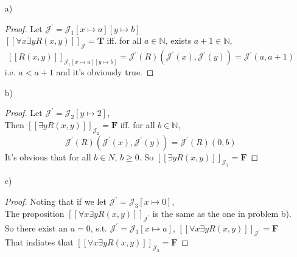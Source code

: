 \documentclass{article}
\begin{document}
\begin{itemize}
    \item[a)]
    \begin{proof}
        Let $\mathcal{J^\prime} = \mathcal{J}_1 [x \mapsto a][y \mapsto b]$ \\
        $
            [\![ \forall x \exists y R(x, y) ]\!]_\mathcal{J} = \mathbf{T}
        $
        iff. for all $a \in \mathbb{N}$, exists $a + 1 \in \mathbb{N}$, 
        \[
            [\![ R(x, y) ]\!]_{\mathcal{J}_1 [x \mapsto a][y \mapsto b]} = \mathcal{J}^\prime (R)(\mathcal{J}^\prime(x), \mathcal{J}^\prime(y)) = \mathcal{J}^\prime(a, a + 1) 
        \]
        i.e. $ a < a + 1 $ and it's obviously true.
    \end{proof}
    \item[b)]
    \begin{proof}
        Let $\mathcal{J}^\prime = \mathcal{J}_2[y \mapsto 2]$, \\
        Then $ [\![ \exists y R(x, y) ]\!]_{\mathcal{J}_2} = \mathbf{F} $ 
        iff. for all $b \in \mathbb{N}$, 
        $$
            \mathcal{J}^\prime (R)(\mathcal{J}^\prime(x), \mathcal{J}^\prime(y)) = \mathcal{J}^\prime (R)(0, b)
        $$
        It's obvious that for all $b \in N$, $b \geqslant 0$. So $ [\![ \exists y R(x, y) ]\!]_{\mathcal{J}_2} = \mathbf{F} $ 
        \qedhere
    \end{proof}
    \item[c)]
    \begin{proof}
        Noting that if we let $\mathcal{J}^\prime = \mathcal{J}_3[x \mapsto 0]$, \\
        The proposition $ [\![ \forall x \exists y R(x, y) ]\!]_{\mathcal{J}^\prime} $ is the same as the one in problem b). \\
        So there exist an $a = 0$, s.t. $\mathcal{J}^\prime = \mathcal{J}_3[x \mapsto a]$, $ [\![ \forall x \exists y R(x, y) ]\!]_{\mathcal{J}^\prime} = \mathbf{F} $ \\
        That indiates that $ [\![ \forall x \exists y R(x, y) ]\!]_{\mathcal{J}_3} = \mathbf{F} $
    \end{proof}
\end{itemize}
\end{document}
